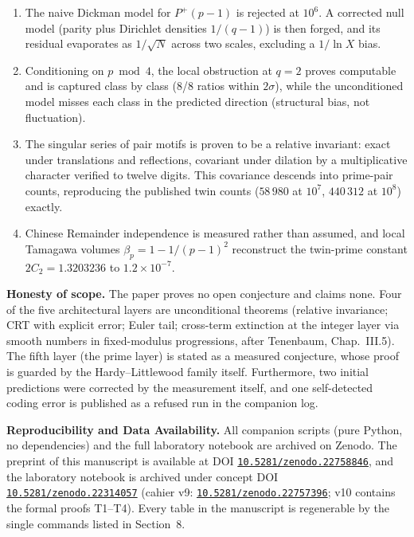 \documentclass[11pt,a4paper]{article}
\begin{document}
\begin{enumerate}
\item The naive Dickman model for $P^{+}(p-1)$ is rejected at $10^{6}$. A corrected null model (parity plus Dirichlet densities $1/(q-1)$) is then forged, and its residual evaporates as $1/\sqrt{N}$ across two scales, excluding a $1/\ln X$ bias.

\item Conditioning on $p \bmod 4$, the local obstruction at $q=2$ proves computable and is captured class by class (8/8 ratios within $2\sigma$), while the unconditioned model misses each class in the predicted direction (structural bias, not fluctuation).

\item The singular series of pair motifs is proven to be a relative invariant: exact under translations and reflections, covariant under dilation by a multiplicative character verified to twelve digits. This covariance descends into prime-pair counts, reproducing the published twin counts ($58\,980$ at $10^{7}$, $440\,312$ at $10^{8}$) exactly.

\item Chinese Remainder independence is measured rather than assumed, and local Tamagawa volumes $\beta_{p}=1-1/(p-1)^{2}$ reconstruct the twin-prime constant $2C_{2}=1.3203236$ to $1.2\times 10^{-7}$.
\end{enumerate}

\textbf{Honesty of scope.} The paper proves no open conjecture and claims none. Four of the five architectural layers are unconditional theorems (relative invariance; CRT with explicit error; Euler tail; cross-term extinction at the integer layer via smooth numbers in fixed-modulus progressions, after Tenenbaum, Chap.~III.5). The fifth layer (the prime layer) is stated as a measured conjecture, whose proof is guarded by the Hardy--Littlewood family itself. Furthermore, two initial predictions were corrected by the measurement itself, and one self-detected coding error is published as a refused run in the companion log.

\textbf{Reproducibility and Data Availability.} All companion scripts (pure Python, no dependencies) and the full laboratory notebook are archived on Zenodo. The preprint of this manuscript is available at DOI \href{https://doi.org/10.5281/zenodo.22758846}{\texttt{10.5281/zenodo.22758846}}, and the laboratory notebook is archived under concept DOI \href{https://doi.org/10.5281/zenodo.22314057}{\texttt{10.5281/zenodo.22314057}} (cahier v9: \href{https://doi.org/10.5281/zenodo.22757396}{\texttt{10.5281/zenodo.22757396}}; v10 contains the formal proofs T1--T4). Every table in the manuscript is regenerable by the single commands listed in Section~8.
\end{document}

